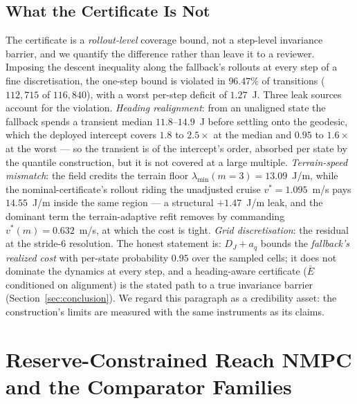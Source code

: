 \documentclass[preprint,12pt]{elsarticle}
\begin{document}
\subsection{What the Certificate Is Not}
The certificate is a \emph{rollout-level} coverage bound, not a
step-level invariance barrier, and we quantify the difference rather
than leave it to a reviewer. Imposing the descent inequality along
the fallback's rollouts at every step of a fine discretisation, the
one-step bound is violated in $96.47\%$ of transitions
($112{,}715$ of $116{,}840$), with a worst per-step deficit of
$1.27$~J.
 Three leak sources account for the violation. \emph{Heading
realignment}: from an unaligned state the fallback spends a transient
median $11.8$--$14.9$~J before settling onto the geodesic, which
the deployed intercept covers $1.8$ to $2.5\times$ at the median
and $0.95$ to $1.6\times$ at the worst --- so the transient is of
the intercept's
order, absorbed per state by the quantile construction, but it is not
covered at a large multiple. \emph{Terrain-speed
mismatch}: the field credits the terrain floor
$\lambda_{\min}(m{=}3) = 13.09$~J/m, while the nominal-certificate's
rollout riding the unadjusted cruise $v^{*} = 1.095$~m/s pays
$14.55$~J/m inside the same region --- a structural $+1.47$~J/m leak,
and the dominant term the terrain-adaptive refit removes by commanding
$v^{*}(m) = 0.632$~m/s, at which the cost is tight.
\emph{Grid discretisation}: the residual at the stride-6
resolution. The honest statement is: $D_J + a_q$ bounds the
\emph{fallback's realized cost} with per-state probability $0.95$
over the sampled cells; it does not dominate the dynamics at every
step, and a heading-aware certificate ($\bar E$ conditioned on
alignment) is the stated path to a true invariance barrier
(Section~\ref{sec:conclusion}). We regard this paragraph as a
credibility asset: the construction's limits are measured with the
same instruments as its claims.

\section{Reserve-Constrained Reach NMPC and the Comparator Families}
\label{sec:controller}
\end{document}
